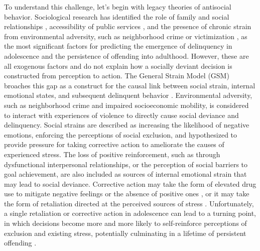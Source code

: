 \documentclass[utf8]{article}
\begin{document}
To understand this challenge, let's begin with legacy theories of antisocial behavior. Sociological research has identified the role of family and social relationships \citep{tolan1997assessment,henry2001longitudinal}, accessibility of public services \citep{molnar2008effects}, and the presence of chronic strain from environmental adversity, such as neighborhood crime or victimization \citep{esbensen1991juvenile}, as the most significant factors for predicting the emergence of delinquency in adolescence and the persistence of offending into adulthood. However, these are all exogenous factors and do not explain how a socially deviant decision is constructed from perception to action. The General Strain Model (GSM) broaches this gap as a construct for the causal link between social strain, internal emotional states, and subsequent delinquent behavior \citep{agnew2001building,agnew2007pressure}. Environmental adversity, such as neighborhood crime and impaired socioeconomic mobility, is considered to interact with experiences of violence to directly cause social deviance and delinquency. Social strains are described as increasing the likelihood of negative emotions, enforcing the perceptions of social exclusion, and hypothesized to provide pressure for taking corrective action to ameliorate the causes of experienced stress. The loss of positive reinforcement, such as through dysfunctional interpersonal relationships, or the perception of social barriers to goal achievement, are also included as sources of internal emotional strain that may lead to social deviance. Corrective action may take the form of elevated drug use to mitigate negative feelings or the absence of positive ones \citep{slocum2010general}, or it may take the form of retaliation directed at the perceived sources of stress \citep{warner2003strain}. Unfortunately, a single retaliation or corrective action in adolescence can lead to a turning point, in which decisions become more and more likely to self-reinforce perceptions of exclusion and existing stress, potentially culminating in a lifetime of persistent offending \citep{laub1993turning}. 
\end{document}
